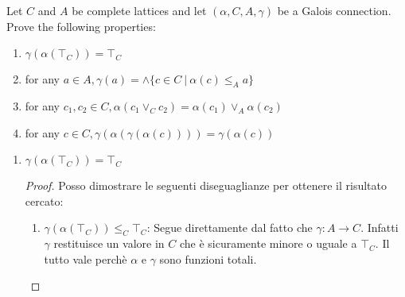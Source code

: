 {Let $C$ and $A$ be complete lattices and let $(\alpha, C, A, \gamma)$ be a Galois connection. Prove the following properties:
\begin{enumerate}
	\item $\gamma(\alpha(\top_C)) = \top_C$
	\item for any $a \in A, \gamma(a) = \wedge \{c \in C\ |\ \alpha(c) \leq_A a \}$ 
	\item for any $c_1, c_2 \in C, \alpha(c_1 \vee_C c_2) = \alpha(c_1) \vee_A \alpha(c_2)$
	\item for any $c \in C, \gamma(\alpha(\gamma(\alpha(c)))) = \gamma(\alpha(c))$
\end{enumerate}	
}
{
\begin{enumerate}
	\item $\boxed{\gamma(\alpha(\top_C)) = \top_C}$
	\begin{proof}
	Posso dimostrare le seguenti diseguaglianze per ottenere il risultato cercato:
	\begin{enumerate}
		\item
		\label{ex2:item:gamma:alpha:topC}
		$\gamma(\alpha(\top_C)) \leq_C \top_C$: Segue direttamente dal fatto che $\gamma:A \to C$.
		Infatti $\gamma$ restituisce un valore in $C$ che è sicuramente minore o uguale a $\top_C$.
		Il tutto vale perchè $\alpha$ e $\gamma$ sono funzioni totali.
		

\end{enumerate}
\end{proof}
\end{enumerate}}
